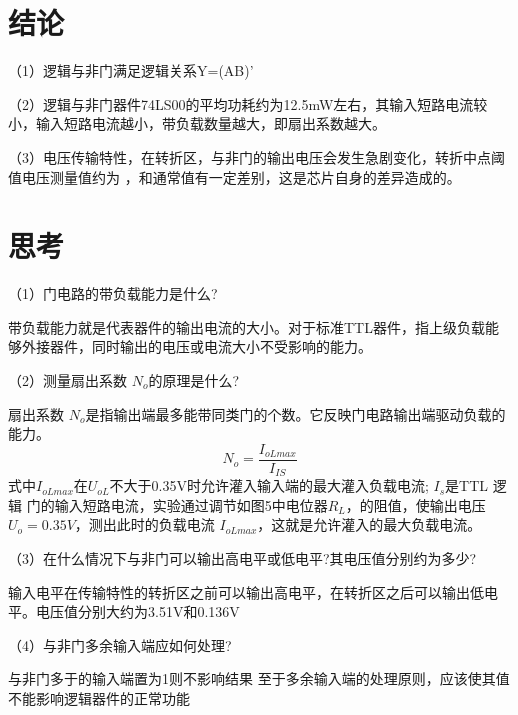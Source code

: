 \documentclass{article}
\begin{document}
\section{结论}
（1）逻辑与非门满足逻辑关系Y=(AB)'\par 
（2）逻辑与非门器件74LS00的平均功耗约为12.5mW左右，其输入短路电流较小，输入短路电流越小，带负载数量越大，即扇出系数越大。\par
（3）电压传输特性，在转折区，与非门的输出电压会发生急剧变化，转折中点阈值电压测量值约为   ，和通常值有一定差别，这是芯片自身的差异造成的。
\par
\newpage
\section{思考}
（1）门电路的带负载能力是什么?\par 
带负载能力就是代表器件的输出电流的大小。对于标准TTL器件，指上级负载能够外接器件，同时输出的电压或电流大小不受影响的能力。\par

（2）测量扇出系数 $N_o$的原理是什么?\par

扇出系数 $N_o$是指输出端最多能带同类门的个数。它反映门电路输出端驱动负载的能力。 \[N_o=\frac{I_{oLmax}}{I_{IS}}\]
式中$I_{oLmax}$在$U_{oL}$不大于0.35V时允许灌入输入端的最大灌入负载电流;
$I_s$是TTL 逻辑 门的输入短路电流，实验通过调节如图5中电位器$ R_L$，的阻值，使输出电压$U_o=0.35V$，测出此时的负载电流 $I_{oLmax}$，这就是允许灌入的最大负载电流。
\par 
（3）在什么情况下与非门可以输出高电平或低电平?其电压值分别约为多少?\par 
输入电平在传输特性的转折区之前可以输出高电平，在转折区之后可以输出低电平。电压值分别大约为3.51V和0.136V
\par
（4）与非门多余输入端应如何处理?\par
与非门多于的输入端置为1则不影响结果
至于多余输入端的处理原则，应该使其值不能影响逻辑器件的正常功能\par
\end{document}

